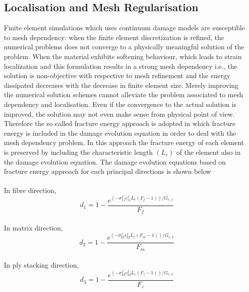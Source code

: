\documentclass[a4paper,12pt]{extarticle}
\begin{document}
\subsection{Localisation and Mesh Regularisation}
\indent\indent\indent Finite element simulations which uses continuum damage models are susceptible to mesh dependency: when the finite element discretization  is refined, the numerical problems does not converge to a physically meaningful solution of the problem. When the material exhibits softening behaviour, which leads to strain localization and this formulation results in a strong mesh dependency i.e., the solution is non-objective with respective to mesh refinement and the energy dissipated  decreases with the decrease in finite element size. Merely improving the numerical solution schemes cannot alleviate the problem associated to mesh dependency and localisation. Even if the convergence to the actual solution is improved, the solution may not even make sense from physical point of view. Therefore the so called fracture energy approach is adopted in which fracture energy is included in the damage evolution equation in order to deal with the mesh dependency problem. In this approach the fracture energy of each element is preserved by including the characteristic length $(L_{c})$ of the element also in the damage evolution equation. The damage evolution equations based on fracture energy approach for each principal directions is shown below
\\
\\
In fibre direction,
\begin{equation}
d_{1} = 1 - \frac{e^{(-\sigma_{11}^{f}\epsilon_{11}^{f}L_{c}(F_{f} - 1))    /G_{c,1}}}{F_{f}}   
\end{equation}
\\
In matrix direction,
\begin{equation}
d_{2} = 1 - \frac{e^{(-\sigma_{22}^{f}\epsilon_{22}^{f}L_{c}(F_{m} - 1))    /G_{c,2}}}{F_{m}}   
\end{equation}
\\
In ply stacking direction,
\begin{equation}
d_{3} = 1 - \frac{e^{(-\sigma_{33}^{f}\epsilon_{33}^{f}L_{c}(F_{z} - 1))    /G_{c,3}}}{F_{z}}   
\end{equation}
\\
\end{document}
